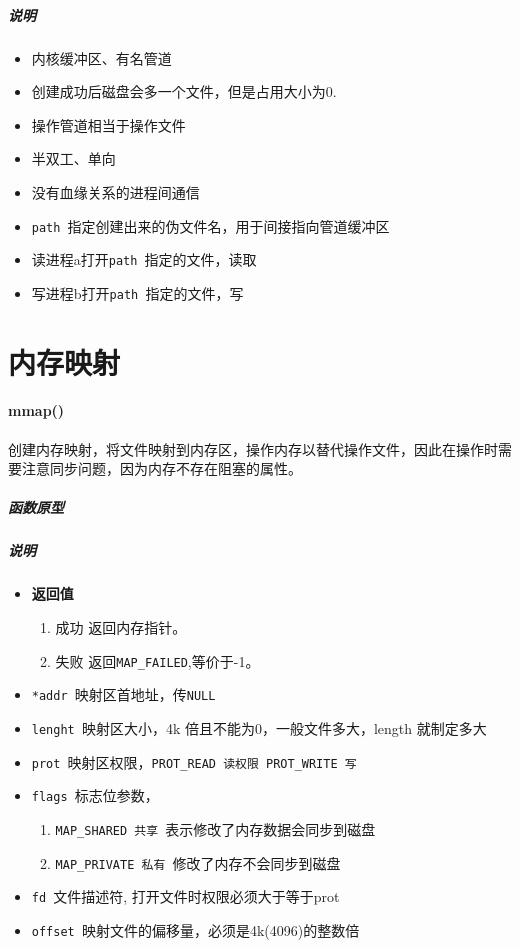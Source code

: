 \documentclass[UTF8,a4paper,12pt]{ctexbook}
\begin{document}
			\subparagraph{说明}
				\begin{itemize}[itemindent = 1em]
					\item 内核缓冲区、有名管道
					\item 创建成功后磁盘会多一个文件，但是占用大小为0.
					\item 操作管道相当于操作文件
					\item 半双工、单向
					\item 没有血缘关系的进程间通信
					\item \verb|path |指定创建出来的伪文件名，用于间接指向管道缓冲区
					\item 读进程a打开\verb|path |指定的文件，读取
					\item 写进程b打开\verb|path |指定的文件，写
				\end{itemize}
				
	\section{内存映射}
		\paragraph{mmap()}创建内存映射，将文件映射到内存区，操作内存以替代操作文件，因此在操作时需要注意同步问题，因为内存不存在阻塞的属性。
			\subparagraph{函数原型}
		
			\subparagraph{说明}
				\begin{itemize}[itemindent = 1em]
					\item \textbf{返回值}
						\begin{enumerate}[itemindent = 1em]
							\item 成功 返回内存指针。
							\item 失败 返回\verb|MAP_FAILED|,等价于-1。
						\end{enumerate}
					\item \verb|*addr |映射区首地址，传\verb|NULL|
					\item \verb|lenght |映射区大小，4k 倍且不能为0，一般文件多大，length 就制定多大
					\item \verb|prot |映射区权限，\verb|PROT_READ 读权限 PROT_WRITE 写| 
					\item \verb|flags |标志位参数，
						\begin{enumerate}[itemindent = 1em]
							\item \verb|MAP_SHARED 共享 |表示修改了内存数据会同步到磁盘 
							\item \verb|MAP_PRIVATE 私有 |修改了内存不会同步到磁盘
						\end{enumerate}
					\item \verb|fd |文件描述符, 打开文件时权限必须大于等于prot
					\item \verb|offset |映射文件的偏移量，必须是4k(4096)的整数倍
				\end{itemize}
			
\end{document}
